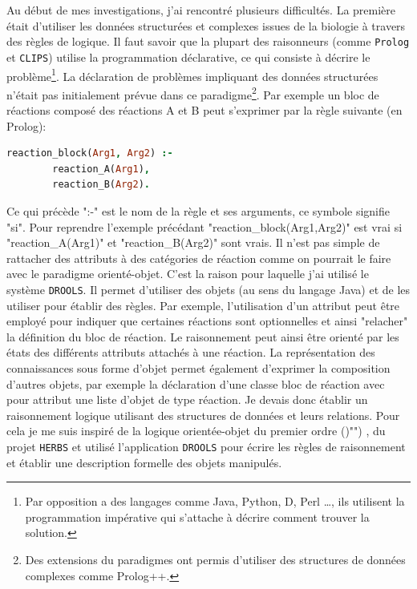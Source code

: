 \begin{refsegment}
Au début de mes investigations, j'ai rencontré plusieurs difficultés. La première était d'utiliser les données structurées et complexes issues de la biologie à travers des règles de logique. Il faut savoir que la plupart des raisonneurs (comme \texttt{Prolog} et \texttt{CLIPS}) utilise la programmation déclarative, ce qui consiste à décrire le problème\footnote{Par opposition a des langages comme Java, Python, D, Perl \ldots, ils utilisent la programmation impérative qui s'attache à décrire comment trouver la solution.}. La déclaration de problèmes impliquant  des données structurées n'était pas initialement prévue dans ce paradigme\footnote{Des extensions du paradigmes ont permis d'utiliser des structures de données complexes comme Prolog++.}. Par exemple un bloc de réactions composé des réactions A et B peut s'exprimer par la règle suivante (en Prolog):

\begin{lstlisting}[basicstyle=\small\normalfont\ttfamily,language=Prolog]
    reaction_block(Arg1, Arg2) :-
        reaction_A(Arg1),
        reaction_B(Arg2).
\end{lstlisting}

Ce qui précède  ":-" est le nom de la règle et ses arguments, ce symbole signifie "si". Pour reprendre l'exemple précédant "reaction\_block(Arg1,Arg2)" est vrai si "reaction\_A(Arg1)" et "reaction\_B(Arg2)" sont vrais. Il n'est pas simple de rattacher des attributs à des catégories de réaction comme on pourrait le faire avec le paradigme orienté-objet. C'est la raison pour laquelle j'ai utilisé le système \texttt{DROOLS}. Il permet d'utiliser des objets (au sens du langage Java)  et de les utiliser pour établir des règles. Par exemple, l'utilisation d'un attribut peut être employé pour indiquer que certaines réactions sont optionnelles et ainsi "relacher" la définition du bloc de réaction. Le raisonnement peut ainsi être orienté par les états des différents attributs attachés à une réaction. La représentation des connaissances sous forme d'objet permet également d'exprimer la composition d'autres objets, par exemple la déclaration d'une classe bloc de réaction avec pour attribut une liste d'objet de type réaction. Je devais donc établir un raisonnement logique utilisant des structures de données et leurs relations. Pour cela je me suis inspiré de la logique orientée-objet du premier ordre ()"") \cite{amir1999object}, du projet \texttt{\gls{HERBS}} et utilisé l'application \texttt{DROOLS} pour écrire les règles de raisonnement et établir une description formelle des objets manipulés.


\end{refsegment}
